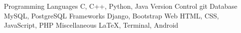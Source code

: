 
\begin{cvskills}
  \cvskill
    {Programming Languages}
    {C, C++, Python, Java}
  \cvskill
    {Version Control}
    {git}
  \cvskill
    {Database}
    {MySQL, PostgreSQL}
  \cvskill
    {Frameworks}
    {Django, Bootstrap}
  \cvskill
    {Web}
    {HTML, CSS, JavaScript, PHP}
  \cvskill
    {Miscellaneous}
    {\LaTeX, Terminal, Android}
\end{cvskills}